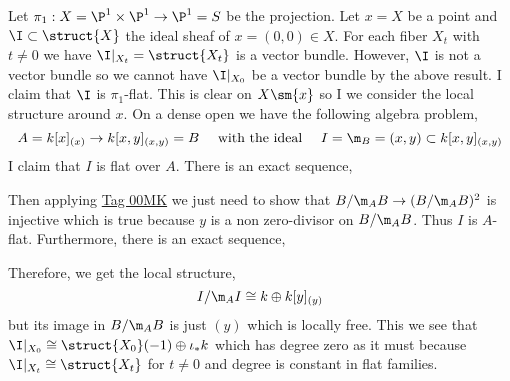 \documentclass[12pt]{article}
\begin{document}
\begin{example}
Let $\pi_1 : X = \P^1 \times \P^1 \to \P^1 = S$ be the projection. Let $x = X$ be a point and $\I \subset \struct{X}$ the ideal sheaf of $x = (0,0) \in X$. For each fiber $X_t$ with $t \neq 0$ we have $\I|_{X_t} = \struct{X_t}$ is a vector bundle. However, $\I$ is not a vector bundle so we cannot have $\I|_{X_0}$ be a vector bundle by the above result. I claim that $\I$ is $\pi_1$-flat. This is clear on $X \sm \{ x \}$ so I we consider the local structure around $x$. On a dense open we have the following algebra problem,
\[ A = k[x]_{(x)} \to k[x,y]_{(x,y)} = B \quad \text{ with the ideal } \quad I = \m_B = (x,y) \subset k[x,y]_{(x,y)} \]
I claim that $I$ is flat over $A$. There is an exact sequence,
\begin{center}
\end{center}
Then applying \href{https://stacks.math.columbia.edu/tag/00MK}{Tag 00MK} we just need to show that $B/\m_A B \to (B / \m_A B)^2$ is injective which is true because $y$ is a non zero-divisor on $B / \m_A B$. Thus $I$ is $A$-flat. Furthermore, there is an exact sequence,
\begin{center}
\end{center}
Therefore, we get the local structure,
\[ I / \m_A I \cong k \oplus k[y]_{(y)} \]
but its image in $B / \m_A B$ is just $(y)$ which is locally free. This we see that $\I|_{X_0} \cong \struct{X_0}(-1) \oplus \iota_* k$ which has degree zero as it must because $\I|_{X_t} \cong \struct{X_t}$ for $t \neq 0$ and degree is constant in flat families.
\end{example}
\end{document}
